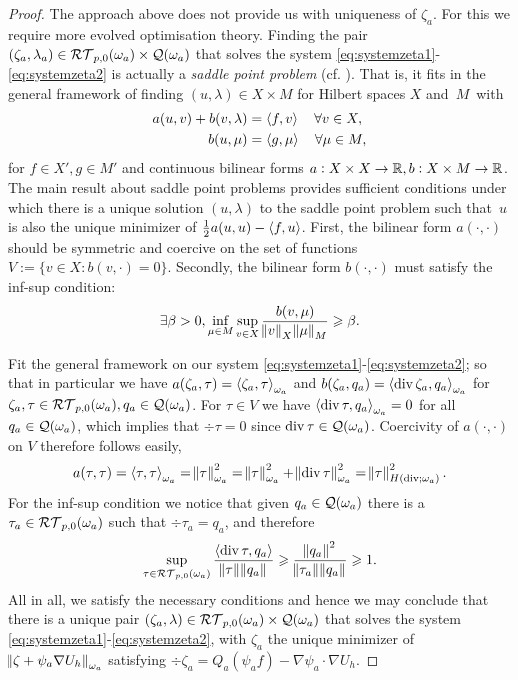 \documentclass[thesis.tex]{subfiles}
\begin{document}
\begin{proof}
  The approach above does not provide us with uniqueness of $\zeta_a$. For this we require more evolved optimisation theory. 
  Finding the pair $(\zeta_a, \lambda_a) \in \mathcal{RT}_{p,0}(\omega_a) \times \mathcal{Q}(\omega_a)$ that solves the system 
  \eqref{eq:systemzeta1}-\eqref{eq:systemzeta2} is actually a \emph{saddle point problem} (cf. \cite{brezzimixed, braess2007finite}).
  That is, it fits in the general framework of finding $(u, \lambda) \in X \times M$ for Hilbert spaces $X$ and~$M$~with
    \begin{align*}
      a(u,v) + b(v,\lambda) &= \left \langle f,v \right \rangle \quad \forall v \in X,\\
      b(u, \mu) &= \left \langle g,\mu \right \rangle \quad \forall \mu \in M,
    \end{align*}
    for $f \in X', g \in M'$ and continuous bilinear forms $a: X \times X \to \mathbb{R}, b : X \times M \to \mathbb{R}$.
    The main result about saddle point problems \cite[Thm~4.3]{braess2007finite} provides sufficient conditions under which there 
    is a unique solution $(u, \lambda)$ to the saddle point problem such that~$u$ is also the unique minimizer of 
    $\frac{1}{2} a(u,u) - \left \langle f,u \right \rangle$. First, the bilinear form $a(\cdot, \cdot)$ should be symmetric and coercive on
    the set of functions $V := \{v \in X : b(v, \cdot) = 0\}$.
    Secondly, the bilinear form $b(\cdot, \cdot)$ must satisfy the inf-sup condition: 
    \[
      \exists \beta > 0, \inf_{\mu \in M} \sup_{v \in X}\frac{b(v,\mu)}{\norm{v}_X \norm{\mu}_M} \geqslant \beta.
    \]

    Fit the general framework on our system \eqref{eq:systemzeta1}-\eqref{eq:systemzeta2}; so that in particular we 
    have $a(\zeta_a,\tau) = \left \langle \zeta_a,\tau \right \rangle_{\omega_a}$ and $b(\zeta_a,q_a) = \left \langle \operatorname{div} \zeta_a,q_a \right \rangle_{\omega_a}$ for $\zeta_a, \tau \in \mathcal{RT}_{p,0}(\omega_a), q_a \in \mathcal{Q}(\omega_a)$. For $\tau \in V$ we have $\left \langle \operatorname{div} \tau, q_a \right \rangle_{\omega_a} = 0$ for all $q_a \in \mathcal{Q}(\omega_a)$, which implies that $\div \tau = 0$ since $\operatorname{div} \tau \in \mathcal{Q}(\omega_a)$. Coercivity of  $a(\cdot, \cdot)$ on $V$ therefore follows easily,
    \[
      a(\tau,\tau) = \left \langle \tau,\tau \right \rangle_{\omega_a} = \norm{\tau}^2_{\omega_a} = \norm{\tau}^2_{\omega_a} + \norm{\operatorname{div} \tau}^2_{\omega_a} = \norm{\tau}^2_{H(\operatorname{div}; \omega_a)}.
    \]
    For the inf-sup condition we notice that given $q_a \in \mathcal{Q}(\omega_a)$ there is a $ \tau_a \in \mathcal{RT}_{p,0}(\omega_a)$
    such that $\div  \tau_a = q_a$, and therefore
    \[
      \sup_{\tau \in \mathcal{RT}_{p,0}(\omega_a)} \frac{\left \langle \operatorname{div} \tau, q_a \right \rangle}{\norm{\tau}\norm{q_a}} \geqslant \frac{\norm{q_a}^2}{\norm{ \tau_a}\norm{q_a}} \geqslant 1.
    \]
    All in all, we satisfy the necessary conditions and hence we may conclude that there is a unique pair $(\zeta_a, \lambda) \in \mathcal{RT}_{p,0}(\omega_a) \times \mathcal{Q}(\omega_a)$ that solves the system \eqref{eq:systemzeta1}-\eqref{eq:systemzeta2}, with $\zeta_a$ the
    unique minimizer of $\norm{\zeta + \psi_a \nabla U_h}_{\omega_a}$ satisfying $\div \zeta_a = Q_a(\psi_a f) - \nabla \psi_a \cdot \nabla U_h$.
\end{proof}
\end{document}
